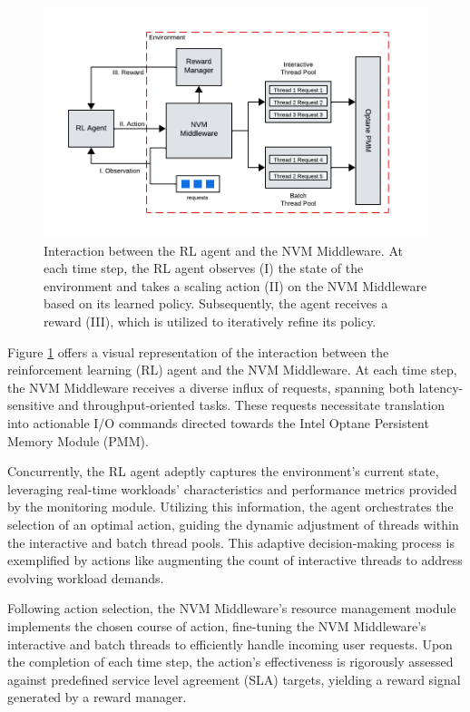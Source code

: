 \begin{figure}[ht]
  \centering
  \includegraphics[scale=1]{images/rl_workflow.png}
  \caption[Interaction between RL agent and NVM Middleware]{Interaction between the RL agent and the NVM Middleware. At each time step, the RL agent observes (I) the state of the environment and takes a scaling action (II) on the NVM Middleware based on its learned policy. Subsequently, the agent receives a reward (III), which is utilized to iteratively refine its policy.}
  \label{fig:rl_workflow}
\end{figure}

Figure \ref{fig:rl_workflow} offers a visual representation of the interaction between the reinforcement learning (RL) agent and the NVM Middleware. At each time step, the NVM Middleware receives a diverse influx of requests, spanning both latency-sensitive and throughput-oriented tasks. These requests necessitate translation into actionable I/O commands directed towards the Intel Optane Persistent Memory Module (PMM).

Concurrently, the RL agent adeptly captures the environment's current state, leveraging real-time workloads' characteristics and performance metrics provided by the monitoring module. Utilizing this information, the agent orchestrates the selection of an optimal action, guiding the dynamic adjustment of threads within the interactive and batch thread pools. This adaptive decision-making process is exemplified by actions like augmenting the count of interactive threads to address evolving workload demands.

Following action selection, the NVM Middleware's resource management module implements the chosen course of action, fine-tuning the NVM Middleware's interactive and batch threads to efficiently handle incoming user requests. Upon the completion of each time step, the action's effectiveness is rigorously assessed against predefined service level agreement (SLA) targets, yielding a reward signal generated by a reward manager.

